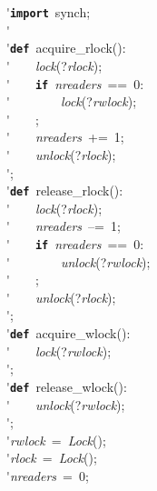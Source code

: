 \'\>\texttt{\textbf{import}}~synch;\\

\'\>\\

\'\>\texttt{\textbf{def}}~acquire\_rlock():\\

\'\>~~~~\textit{lock}(?\textit{rlock});\\

\'\>~~~~\texttt{\textbf{if}}~\textit{nreaders}~==~0:\\

\'\>~~~~~~~~\textit{lock}(?\textit{rwlock});\\

\'\>~~~~;\\

\'\>~~~~\textit{nreaders}~+=~1;\\

\'\>~~~~\textit{unlock}(?\textit{rlock});\\

\'\>;\\

\'\>\texttt{\textbf{def}}~release\_rlock():\\

\'\>~~~~\textit{lock}(?\textit{rlock});\\

\'\>~~~~\textit{nreaders}~--=~1;\\

\'\>~~~~\texttt{\textbf{if}}~\textit{nreaders}~==~0:\\

\'\>~~~~~~~~\textit{unlock}(?\textit{rwlock});\\

\'\>~~~~;\\

\'\>~~~~\textit{unlock}(?\textit{rlock});\\

\'\>;\\

\'\>\texttt{\textbf{def}}~acquire\_wlock():\\

\'\>~~~~\textit{lock}(?\textit{rwlock});\\

\'\>;\\

\'\>\texttt{\textbf{def}}~release\_wlock():\\

\'\>~~~~\textit{unlock}(?\textit{rwlock});\\

\'\>;\\

\'\>\textit{rwlock}~=~\textit{Lock}();\\

\'\>\textit{rlock}~=~\textit{Lock}();\\

\'\>\textit{nreaders}~=~0;